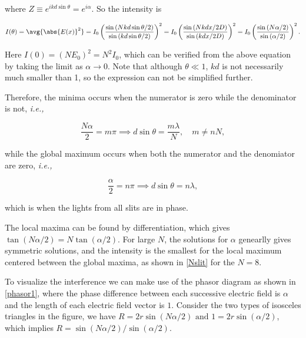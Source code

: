 \documentclass[english,a4paper,12pt]{report}
\begin{document}
where \(Z \equiv e^{ikd\sin \theta } = e^{i\alpha }   \). So the intensity is 

\begin{equation}
    I(\theta ) = \avg{\abs{E(x)}^2 } = I_0 \left( \frac{\sin \left( Nkd\sin \theta /2 \right)}{\sin \left(k d\sin \theta /2  \right)}  \right)^2 = I_0 \left( \frac{\sin \left( Nkdx/2D  \right)}{\sin \left( kdx/2D \right)}  \right)^2 = I_0 \left( \frac{\sin \left(N\alpha /2 \right)}{\sin \left(\alpha /2  \right)}  \right)^2. \label{Nslits} 
\end{equation}

Here \(I (0) = (NE_0 )^2 = N^2I_0 \), which can be verified from the above equation by taking the limit as \(\alpha \to 0\). Note that although \(\theta \ll 1\), \(kd\) is not necessarily much smaller than 1, so the expression can not be simplified further. 

Therefore, the minima occurs when the numerator is zero while the denominator is not, \textit{i.e.,} 

\begin{equation}
    \frac{N\alpha }{2} = m\pi \implies d \sin \theta = \frac{m \lambda }{N} , \quad m \neq nN,
\end{equation}

while the global maximum occurs when both the numerator and the denomiator are zero, \textit{i.e.,}

\begin{equation}
    \frac{\alpha }{2} = n \pi \implies d\sin \theta = n\lambda , \label{intmax} 
\end{equation}

which is when the lights from all slits are in phase. 

The local maxima can be found by differentiation, which gives \(\tan (N\alpha /2) = N\tan (\alpha /2)\). For large \(N\), the solutions for \(\alpha \) genearlly gives symmetric solutions, and the intensity is the smallest for the local maximum centered between the global maxima, as shown in \cref{Nslit} for the \(N=8\).


To visualize the interference we can make use of the phasor diagram as shown in \cref{phasor1}, where the phase difference between each successive electric field is \(\alpha \) and the length of each electric field vector is \(1\). Consider the two types of isosceles triangles in the figure, we have \(R = 2r \sin (N \alpha /2) \text { and } 1 = 2r \sin (\alpha /2)\), which implies \(R = \sin (N \alpha /2)/\sin (\alpha /2)\). 
\end{document}
